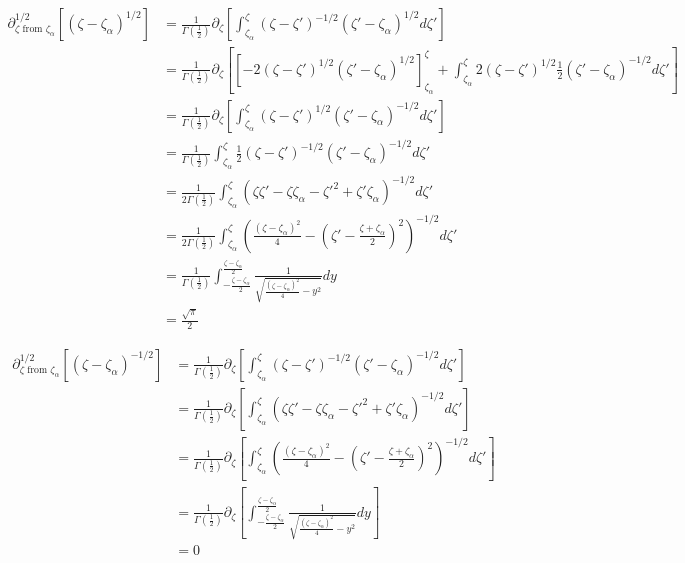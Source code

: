 \documentclass{article}
\begin{document}
\begin{align*}
\partial_{\zeta \text{ from } \zeta_\alpha}^{1/2}\left[(\zeta-\zeta_\alpha)^{1/2}\right]&=\frac{1}{\Gamma\left(\tfrac{1}{2}\right)}\partial_\zeta\left[\int_{\zeta_\alpha}^{\zeta}(\zeta-\zeta')^{-1/2}(\zeta'-\zeta_\alpha)^{1/2}d\zeta'\right]\\
&=\frac{1}{\Gamma\left(\tfrac{1}{2}\right)}\partial_{\zeta}\left[\left[-2(\zeta-\zeta')^{1/2}(\zeta'-\zeta_\alpha)^{1/2}\right]_{\zeta_\alpha}^{\zeta}+\int_{\zeta_\alpha}^{\zeta}2(\zeta-\zeta')^{1/2}\frac{1}{2}(\zeta'-\zeta_{\alpha})^{-1/2}d\zeta'\right]\\
&=\frac{1}{\Gamma\left(\tfrac{1}{2}\right)}\partial_{\zeta}\left[\int_{\zeta_\alpha}^{\zeta}(\zeta-\zeta')^{1/2}(\zeta'-\zeta_{\alpha})^{-1/2}d\zeta'\right]\\
&=\frac{1}{\Gamma\left(\tfrac{1}{2}\right)}\int_{\zeta_\alpha}^{\zeta}\frac{1}{2}(\zeta-\zeta')^{-1/2}(\zeta'-\zeta_\alpha)^{-1/2}d\zeta'\\
&=\frac{1}{2\Gamma\left(\tfrac{1}{2}\right)}\int_{\zeta_\alpha}^{\zeta}(\zeta\zeta'-\zeta\zeta_\alpha-\zeta'^2+\zeta'\zeta_\alpha)^{-1/2}d\zeta'\\
&=\frac{1}{2\Gamma\left(\tfrac{1}{2}\right)}\int_{\zeta_\alpha}^{\zeta}\left(\frac{(\zeta-\zeta_\alpha)^2}{4}-\left(\zeta'-\frac{\zeta+\zeta_\alpha}{2}\right)^2\right)^{-1/2}d\zeta'\\
&=\frac{1}{\Gamma\left(\tfrac{1}{2}\right)}\int_{-\tfrac{\zeta-\zeta_{\alpha}}{2}}^{\tfrac{\zeta-\zeta_{\alpha}}{2}}\frac{1}{\sqrt{\tfrac{(\zeta-\zeta_{\alpha})^2}{4}-y^2}}dy\\
&=\frac{\sqrt{\pi}}{2}
\end{align*}

\begin{align*}
\partial_{\zeta \text{ from } \zeta_\alpha}^{1/2}\left[(\zeta-\zeta_\alpha)^{-1/2}\right]&=\frac{1}{\Gamma\left(\tfrac{1}{2}\right)}\partial_\zeta\left[\int_{\zeta_\alpha}^{\zeta}(\zeta-\zeta')^{-1/2}(\zeta'-\zeta_\alpha)^{-1/2}d\zeta'\right]\\
&=\frac{1}{\Gamma\left(\tfrac{1}{2}\right)}\partial_{\zeta}\left[\int_{\zeta_\alpha}^{\zeta}(\zeta\zeta'-\zeta\zeta_\alpha-\zeta'^2+\zeta'\zeta_\alpha)^{-1/2}d\zeta'\right]\\
&=\frac{1}{\Gamma\left(\tfrac{1}{2}\right)}\partial_{\zeta}\left[\int_{\zeta_\alpha}^{\zeta}\left(\frac{(\zeta-\zeta_\alpha)^2}{4}-\left(\zeta'-\frac{\zeta+\zeta_\alpha}{2}\right)^2\right)^{-1/2}d\zeta'\right]\\
&=\frac{1}{\Gamma\left(\tfrac{1}{2}\right)}\partial_{\zeta}\left[\int_{-\tfrac{\zeta-\zeta_{\alpha}}{2}}^{\tfrac{\zeta-\zeta_{\alpha}}{2}}\frac{1}{\sqrt{\tfrac{(\zeta-\zeta_{\alpha})^2}{4}-y^2}}dy\right]\\
&=0
\end{align*}
\end{document}
